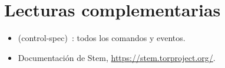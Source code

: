 \section*{Lecturas complementarias}
\begin{itemize}
  \item {} (control-spec)~\cite{torspec}: todos los comandos y eventos.
  \item Documentación de Stem, \url{https://stem.torproject.org/}.
\end{itemize}
